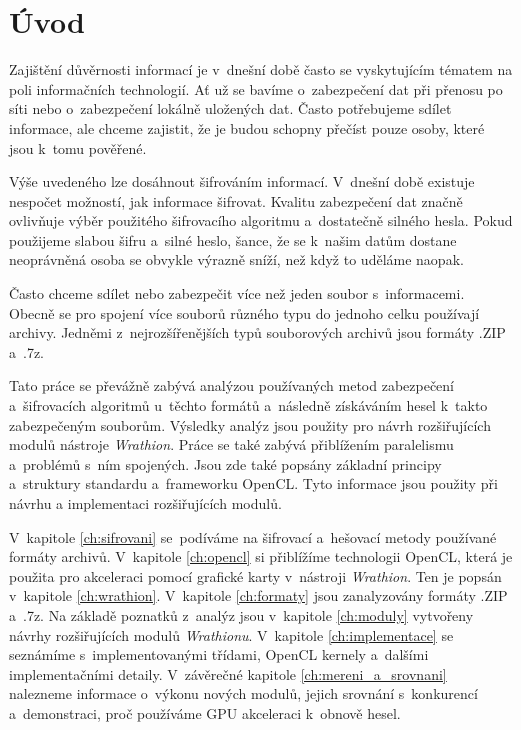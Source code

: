 \chapter{Úvod}
Zajištění důvěrnosti informací je v~dnešní době často se vyskytujícím tématem na poli informačních
technologií. Ať už se bavíme o~zabezpečení dat při přenosu po síti nebo o~zabezpečení lokálně
uložených dat. Často potřebujeme sdílet informace, ale chceme zajistit, že je budou schopny
přečíst pouze osoby, které jsou k~tomu pověřené.

 Výše uvedeného lze dosáhnout šifrováním informací. V~dnešní době existuje nespočet možností, jak
informace šifrovat. Kvalitu zabezpečení dat značně ovlivňuje výběr použitého šifrovacího
algoritmu a~dostatečně silného hesla. Pokud použijeme slabou šifru a~silné heslo, šance, že se
k~našim datům dostane neoprávněná osoba se obvykle výrazně sníží, než když to uděláme naopak.

 Často chceme sdílet nebo zabezpečit více než jeden soubor s~informacemi. Obecně se pro
spojení více souborů různého typu do jednoho celku používají archivy. Jedněmi z~nejrozšířenějších
typů souborových archivů jsou formáty .ZIP a~.7z.

 Tato práce se převážně zabývá analýzou používaných metod zabezpečení a~šifrovacích
algoritmů u~těchto formátů a~následně získáváním hesel k~takto zabezpečeným souborům. Výsledky
analýz jsou použity pro návrh rozšiřujících modulů nástroje {\it Wrathion}. Práce se také
zabývá přiblížením paralelismu a~problémů s~ním spojených. Jsou zde také popsány základní
principy a~struktury standardu a~frameworku OpenCL. Tyto informace jsou použity při návrhu a
implementaci rozšiřujících modulů.

 V~kapitole \ref{ch:sifrovani} se~podíváme na šifrovací a~hešovací metody používané formáty
archivů. V~kapitole \ref{ch:opencl} si přiblížíme technologii OpenCL, která je použita pro
akceleraci pomocí grafické karty v~nástroji {\it Wrathion}. Ten je popsán v~kapitole
\ref{ch:wrathion}. V~kapitole \ref{ch:formaty} jsou zanalyzovány formáty .ZIP a~.7z. Na základě
poznatků z~analýz jsou v~kapitole \ref{ch:moduly} vytvořeny návrhy rozšiřujících modulů {\it
Wrathionu}. V~kapitole \ref{ch:implementace} se seznámíme s~implementovanými třídami, OpenCL
kernely a~dalšími implementačními detaily. V~závěrečné kapitole \ref{ch:mereni_a_srovnani}
nalezneme informace o~výkonu nových modulů, jejich srovnání s~konkurencí a~demonstraci, proč
používáme GPU akceleraci k~obnově hesel.

